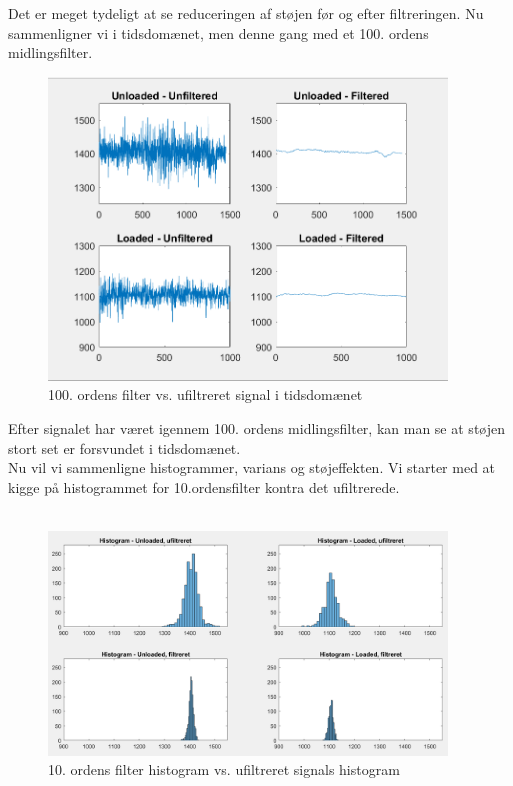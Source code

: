 Det er meget tydeligt at se reduceringen af støjen før og efter filtreringen. Nu sammenligner vi i tidsdomænet, men denne gang med et 100. ordens midlingsfilter.\\

\begin{figure}[H]
	\centering
	\includegraphics[width = 300pt]{Img/100_ordensfilter.PNG}
	\caption{100. ordens filter vs. ufiltreret signal i tidsdomænet}
	\label{fig:100_ordensfilter}
\end{figure}

Efter signalet har været igennem 100. ordens midlingsfilter, kan man se at støjen stort set er forsvundet i tidsdomænet. \\
Nu vil vi sammenligne histogrammer, varians og støjeffekten. Vi starter med at kigge på histogrammet for 10.ordensfilter kontra det ufiltrerede.
\\\\

\begin{figure}[H]
	\centering
	\includegraphics[width = 300pt]{Img/Histogram_10_orden.PNG}
	\caption{10. ordens filter histogram vs. ufiltreret signals histogram}
	\label{fig:Histogram_10_orden}
\end{figure}

